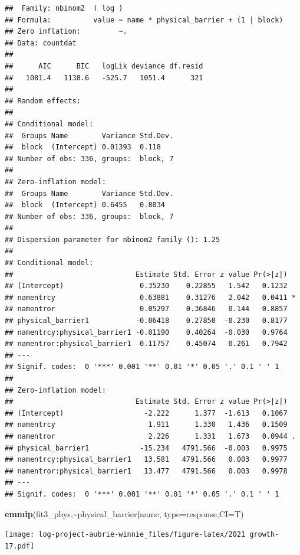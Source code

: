 \documentclass[
]{article}
\newenvironment{Shaded}{\begin{snugshade}}{\end{snugshade}}
\newcommand{\AttributeTok}[1]{\textcolor[rgb]{0.13,0.29,0.53}{#1}}
\newcommand{\FunctionTok}[1]{\textcolor[rgb]{0.13,0.29,0.53}{\textbf{#1}}}
\newcommand{\NormalTok}[1]{#1}
\newcommand{\SpecialCharTok}[1]{\textcolor[rgb]{0.81,0.36,0.00}{\textbf{#1}}}
\newcommand{\StringTok}[1]{\textcolor[rgb]{0.31,0.60,0.02}{#1}}
\begin{document}
\begin{verbatim}
##  Family: nbinom2  ( log )
## Formula:          value ~ name * physical_barrier + (1 | block)
## Zero inflation:         ~.
## Data: countdat
## 
##      AIC      BIC   logLik deviance df.resid 
##   1081.4   1138.6   -525.7   1051.4      321 
## 
## Random effects:
## 
## Conditional model:
##  Groups Name        Variance Std.Dev.
##  block  (Intercept) 0.01393  0.118   
## Number of obs: 336, groups:  block, 7
## 
## Zero-inflation model:
##  Groups Name        Variance Std.Dev.
##  block  (Intercept) 0.6455   0.8034  
## Number of obs: 336, groups:  block, 7
## 
## Dispersion parameter for nbinom2 family (): 1.25 
## 
## Conditional model:
##                             Estimate Std. Error z value Pr(>|z|)  
## (Intercept)                  0.35230    0.22855   1.542   0.1232  
## namentrcy                    0.63881    0.31276   2.042   0.0411 *
## namentror                    0.05297    0.36846   0.144   0.8857  
## physical_barrier1           -0.06418    0.27850  -0.230   0.8177  
## namentrcy:physical_barrier1 -0.01190    0.40264  -0.030   0.9764  
## namentror:physical_barrier1  0.11757    0.45074   0.261   0.7942  
## ---
## Signif. codes:  0 '***' 0.001 '**' 0.01 '*' 0.05 '.' 0.1 ' ' 1
## 
## Zero-inflation model:
##                             Estimate Std. Error z value Pr(>|z|)  
## (Intercept)                   -2.222      1.377  -1.613   0.1067  
## namentrcy                      1.911      1.330   1.436   0.1509  
## namentror                      2.226      1.331   1.673   0.0944 .
## physical_barrier1            -15.234   4791.566  -0.003   0.9975  
## namentrcy:physical_barrier1   13.581   4791.566   0.003   0.9977  
## namentror:physical_barrier1   13.477   4791.566   0.003   0.9978  
## ---
## Signif. codes:  0 '***' 0.001 '**' 0.01 '*' 0.05 '.' 0.1 ' ' 1
\end{verbatim}

\begin{Shaded}
\begin{Highlighting}[]
\FunctionTok{emmip}\NormalTok{(fit3\_phys,}\SpecialCharTok{\textasciitilde{}}\NormalTok{physical\_barrier}\SpecialCharTok{|}\NormalTok{name, }\AttributeTok{type=}\StringTok{\textquotesingle{}response\textquotesingle{}}\NormalTok{,}\AttributeTok{CI=}\NormalTok{T)}
\end{Highlighting}
\end{Shaded}

\texttt{[image: log-project-aubrie-winnie\_files/figure-latex/2021 growth-17.pdf]}
\end{document}
